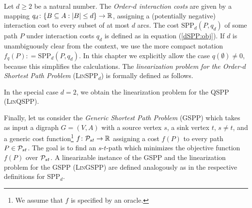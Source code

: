 Let $d \geq 2$ be a natural number. The \emph{Order-$d$ interaction costs} are given by a mapping $q_d\colon \{ B \subseteq A : |B| \leq d \}\to \mathbb{R}$, assigning a (potentially negative) interaction cost to every subset of at most $d$ arcs.
The cost $\text{SPP}_d(P,q_d)$ of some path $P$ under interaction costs $q_d$ is defined as in equation (\ref{dSPP:obj}).
If $d$ is unambiguously clear from the context, we use the  more compact notation $f_q(P): = \text{SPP}_d(P,q_d)$.
 In this chapter we explicitly allow the case $q(\emptyset) \neq 0$, because this simplifies the calculations.  
The \emph{linearization problem for the Order-$d$ Shortest Path Problem} (\textsc{Lin}SPP$_d$)
is formally defined as follows.
\begin{center}
\end{center}
In the special case $d = 2$, we obtain the    linearization problem for the QSPP (\textsc{Lin}QSPP).
\smallskip

Finally, let us consider the \emph{Generic Shortest Path Problem} (GSPP) which takes as input  a 
 digraph $G=(V,A)$ with a source vertex $s$, a sink vertex $t$, $s\neq t$, and a generic cost function\footnote{We assume that $f$ is specified by an oracle.} $f\colon \mathcal{P}_{st} \to \mathbb{R}$  assigning  a cost $f(P)$ to every path $P\in \mathcal{P}_{st}$. 
The goal is to find an $s$-$t$-path  which minimizes the objective function $f(P)$ over $\mathcal{P}_{st}$. 
A linearizable instance of  the GSPP and the linearization problem for the GSPP (\textsc{Lin}GSPP) are  defined analogously as in the respective definitions for SPP$_d$.


